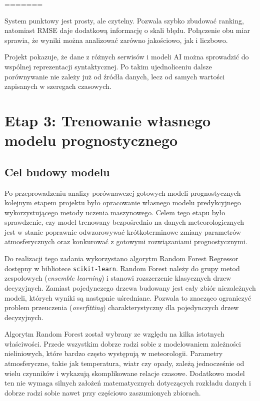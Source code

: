 \documentclass[a4paper,12pt]{article}
\begin{document}
\begin{table}[h]
\begin{table}[h]
\begin{table}[h]
\begin{table}[h]
=======

\noindent
System punktowy jest prosty, ale czytelny. Pozwala szybko zbudować ranking,
natomiast RMSE daje dodatkową informację o skali błędu. Połączenie obu miar
sprawia, że wyniki można analizować zarówno jakościowo, jak i liczbowo.

\noindent
Projekt pokazuje, że dane z różnych serwisów i modeli AI można sprowadzić do
wspólnej reprezentacji syntaktycznej. Po takim ujednoliceniu dalsze
porównywanie nie zależy już od źródła danych, lecz od samych wartości
zapisanych w szeregach czasowych.


\section{Etap 3: Trenowanie własnego modelu prognostycznego}

\subsection{Cel budowy modelu}

Po przeprowadzeniu analizy porównawczej gotowych modeli prognostycznych kolejnym etapem projektu było opracowanie własnego modelu predykcyjnego wykorzystującego metody uczenia maszynowego. Celem tego etapu było sprawdzenie, czy model trenowany bezpośrednio na danych meteorologicznych jest w stanie poprawnie odwzorowywać krótkoterminowe zmiany parametrów atmosferycznych oraz konkurować z gotowymi rozwiązaniami prognostycznymi.

\noindent
Do realizacji tego zadania wykorzystano algorytm Random Forest Regressor dostępny w bibliotece \texttt{scikit-learn}. Random Forest należy do grupy metod zespołowych (\textit{ensemble learning}) i stanowi rozszerzenie klasycznych drzew decyzyjnych. Zamiast pojedynczego drzewa budowany jest cały zbiór niezależnych modeli, których wyniki są następnie uśredniane. Pozwala to znacząco ograniczyć problem przeuczenia (\textit{overfitting}) charakterystyczny dla pojedynczych drzew decyzyjnych.

\noindent
Algorytm Random Forest został wybrany ze względu na kilka istotnych właściwości. Przede wszystkim dobrze radzi sobie z modelowaniem zależności nieliniowych, które bardzo często występują w meteorologii. Parametry atmosferyczne, takie jak temperatura, wiatr czy opady, zależą jednocześnie od wielu czynników i wykazują skomplikowane relacje czasowe. Dodatkowo model ten nie wymaga silnych założeń matematycznych dotyczących rozkładu danych i dobrze radzi sobie nawet przy częściowo zaszumionych zbiorach.


\end{table}
\end{table}
\end{table}
\end{table}
\end{document}
